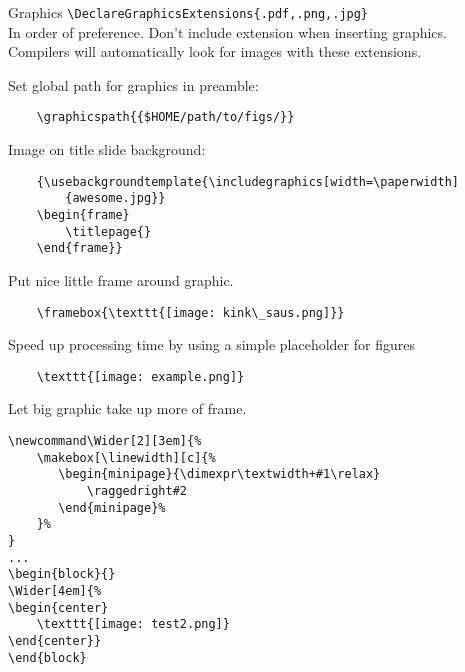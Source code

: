 \documentclass[9pt]{beamer}
\newcommand\Wider[2][3em]{%
    \makebox[\linewidth][c]{%
       \begin{minipage}{\dimexpr\textwidth+#1\relax}
           \raggedright#2
       \end{minipage}%
    }%
}
\begin{document}
\begin{frame}[fragile=singleslide]{Graphics}
    \verb|\DeclareGraphicsExtensions{.pdf,.png,.jpg}|\\
    In order of preference. Don't include extension when inserting
    graphics. Compilers will automatically look for images with these
    extensions.

    Set global path for graphics in preamble:
    \begin{verbatim}
    \graphicspath{{$HOME/path/to/figs/}}
    \end{verbatim}

    Image on title slide background:
    \begin{verbatim}
    {\usebackgroundtemplate{\includegraphics[width=\paperwidth]
        {awesome.jpg}}
    \begin{frame}
        \titlepage{}
    \end{frame}}
    \end{verbatim}

    Put nice little frame around graphic.
    \begin{verbatim}
    \framebox{\texttt{[image: kink\_saus.png]}}
    \end{verbatim}

    Speed up processing time by using a simple placeholder for figures
    \begin{verbatim}
    \texttt{[image: example.png]}
    \end{verbatim}
\end{frame}


\begin{frame}[fragile=singleslide]{}
    Let big graphic take up more of frame.
    \begin{verbatim}
\newcommand\Wider[2][3em]{%
    \makebox[\linewidth][c]{%
       \begin{minipage}{\dimexpr\textwidth+#1\relax}
           \raggedright#2
       \end{minipage}%
    }%
}
...
\begin{block}{}
\Wider[4em]{%
\begin{center}
    \texttt{[image: test2.png]}
\end{center}}
\end{block}
    \end{verbatim}
\end{frame}
\end{document}
